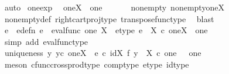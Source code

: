 \begin{isabellebody}
\ auto\isanewline
{}\isamarkupfalse%
%
\endisatagproof
{\isafoldproof}%
%
\isadelimproof
\isanewline
%
\endisadelimproof
\isanewline
{}\isamarkupfalse%
\ one{\isacharunderscore}{\kern0pt}exp{\isacharcolon}{\kern0pt}\isanewline
\ \ {\isachardoublequoteopen}one\isactrlbsup X\isactrlesup \ {\isasymcong}\ one{\isachardoublequoteclose}\isanewline
%
\isadelimproof
%
\endisadelimproof
%
\isatagproof
{}\isamarkupfalse%
\ {\isacharminus}{\kern0pt}\ \isanewline
\ \ \isamarkupfalse%
\ nonempty{\isacharcolon}{\kern0pt}\ {\isachardoublequoteopen}nonempty{\isacharparenleft}{\kern0pt}one\isactrlbsup X\isactrlesup {\isacharparenright}{\kern0pt}{\isachardoublequoteclose}\isanewline
\ \ \ \ \isamarkupfalse%
\ nonempty{\isacharunderscore}{\kern0pt}def\ right{\isacharunderscore}{\kern0pt}cart{\isacharunderscore}{\kern0pt}proj{\isacharunderscore}{\kern0pt}type\ transpose{\isacharunderscore}{\kern0pt}func{\isacharunderscore}{\kern0pt}type\ \isamarkupfalse%
\ blast\isanewline
\ \ \isamarkupfalse%
\ e\ \ e{\isacharunderscore}{\kern0pt}defn{\isacharcolon}{\kern0pt}\ {\isachardoublequoteopen}e\ {\isacharequal}{\kern0pt}\ eval{\isacharunderscore}{\kern0pt}func\ one\ X{\isachardoublequoteclose}\ \ e{\isacharunderscore}{\kern0pt}type{\isacharcolon}{\kern0pt}\ {\isachardoublequoteopen}e\ {\isacharcolon}{\kern0pt}\ X\ {\isasymtimes}\isactrlsub c\ one\isactrlbsup X\isactrlesup \ {\isasymrightarrow}\ one{\isachardoublequoteclose}\isanewline
\ \ \ \ \isamarkupfalse%
\ {\isacharparenleft}{\kern0pt}simp\ add{\isacharcolon}{\kern0pt}\ eval{\isacharunderscore}{\kern0pt}func{\isacharunderscore}{\kern0pt}type{\isacharparenright}{\kern0pt}\isanewline
\ \ \isamarkupfalse%
\ uniqueness{\isacharcolon}{\kern0pt}\ {\isachardoublequoteopen}{\isasymforall}y{\isachardot}{\kern0pt}\ {\isacharparenleft}{\kern0pt}y{\isasymin}\isactrlsub c\ one\isactrlbsup X\isactrlesup \ {\isasymlongrightarrow}\ e\ {\isasymcirc}\isactrlsub c\ {\isacharparenleft}{\kern0pt}id{\isacharparenleft}{\kern0pt}X{\isacharparenright}{\kern0pt}\ {\isasymtimes}\isactrlsub f\ y{\isacharparenright}{\kern0pt}\ {\isacharcolon}{\kern0pt}\ X\ {\isasymtimes}\isactrlsub c\ one\ \ {\isasymrightarrow}\ one{\isacharparenright}{\kern0pt}{\isachardoublequoteclose}\isanewline
\ \ \ \ \isamarkupfalse%
\ {\isacharparenleft}{\kern0pt}meson\ cfunc{\isacharunderscore}{\kern0pt}cross{\isacharunderscore}{\kern0pt}prod{\isacharunderscore}{\kern0pt}type\ comp{\isacharunderscore}{\kern0pt}type\ e{\isacharunderscore}{\kern0pt}type\ id{\isacharunderscore}{\kern0pt}type{\isacharparenright}{\kern0pt}\isanewline

\end{isabellebody}
